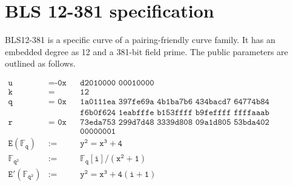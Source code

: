 \documentclass[11pt]{article}
\begin{document}
\appendix
\section{BLS 12-381 specification}
BLS12-381 is a specific curve of a pairing-friendly curve family. It has an embedded degree as 12 and a 381-bit field prime. The public parameters are outlined as follows\cite{bls12381spec}.

\begin{align*}
\texttt{u} &= \texttt{-0x} && \texttt{d2010000 00010000} \\
\texttt{k} &= &&\texttt{12} \\
\texttt{q} &= \texttt{ 0x} && \texttt{1a0111ea 397fe69a 4b1ba7b6 434bacd7 64774b84 f38512bf 6730d2a0} \\
& && \texttt{f6b0f624 1eabfffe b153ffff b9feffff ffffaaab} \\
\texttt{r} &= \texttt{ 0x} && \texttt{73eda753 299d7d48 3339d808 09a1d805 53bda402 fffe5bfe ffffffff}\\
& && \texttt{00000001} \\
\mathtt{E(\mathbb{F}_q)} &:= &&\mathtt{y^2 = x^3 + 4} \\
\mathtt{\mathbb{F}_{q^2}} &:= &&\mathtt{\mathbb{F}_q[i]/(x^2 + 1)} \\
\mathtt{E'(\mathbb{F}_{q^2})} &:= &&\mathtt{y^2 = x^3 + 4(i + 1)} \\
\end{align*}


\end{document}
